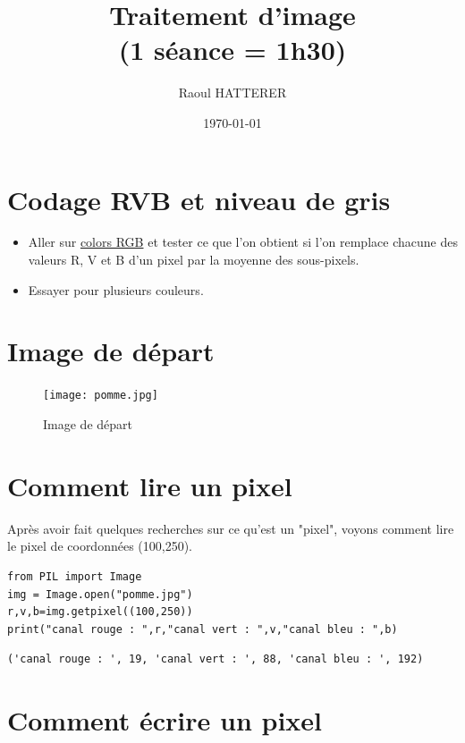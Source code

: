 \documentclass[11pt]{article}
\author{Raoul HATTERER}
\date{\today}
\title{Traitement d'image\\\medskip
\large (1 séance = 1h30)}
\begin{document}
\maketitle
\tableofcontents




\section{Codage RVB et niveau de gris}
\label{sec:org2ae85f0}

\begin{itemize}
\item Aller sur \href{https://www.w3schools.com/colors/colors\_rgb.asp}{colors RGB} et tester ce que l'on obtient si l'on remplace chacune des valeurs R, V et B d'un pixel par la moyenne des sous-pixels.
\item Essayer pour plusieurs couleurs.
\end{itemize}


\section{Image de départ}
\label{sec:orgbdfc1e9}

\begin{figure}[htbp]
\centering
\texttt{[image: pomme.jpg]}
\caption{Image de départ}
\end{figure}


\section{Comment lire un pixel}
\label{sec:orgbe8241a}

Après avoir fait quelques recherches sur ce qu'est un "pixel", voyons comment lire le pixel de coordonnées (100,250).

\begin{verbatim}
from PIL import Image
img = Image.open("pomme.jpg")
r,v,b=img.getpixel((100,250))
print("canal rouge : ",r,"canal vert : ",v,"canal bleu : ",b)
\end{verbatim}

\begin{verbatim}
('canal rouge : ', 19, 'canal vert : ', 88, 'canal bleu : ', 192)
\end{verbatim}


\section{Comment écrire un pixel}
\label{sec:orge91fe4b}
\end{document}
